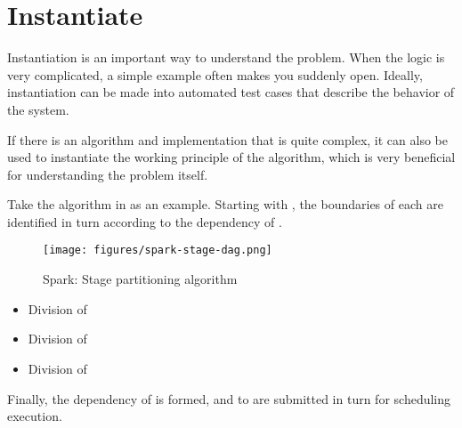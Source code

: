 \section{Instantiate}
\begin{content}
Instantiation is an important way to understand the problem. When the logic is very complicated, a simple example often makes you suddenly open. Ideally, instantiation can be made into automated test cases that describe the behavior of the system.

If there is an algorithm and implementation that is quite complex, it can also be used to instantiate the working principle of the algorithm, which is very beneficial for understanding the problem itself.

Take the  algorithm in  as an example. Starting with , the boundaries of each  are identified in turn according to the dependency of .

\begin{figure}[!htbp]
  \centering
  \texttt{[image: figures/spark-stage-dag.png]}
  \caption{Spark: Stage partitioning algorithm}
  \label{fig:spark-stage-dag}
\end{figure}

\begin{itemize}
 \item Division of 
   \begin{enum}
   \end{enum}

 \item Division of 
   \begin{enum}
   \end{enum}
 \item Division of 
   \begin{enum}
   \end{enum}
\end{itemize}

Finally, the dependency of  is formed, and  to  are submitted in turn for scheduling execution.
\end{content}

